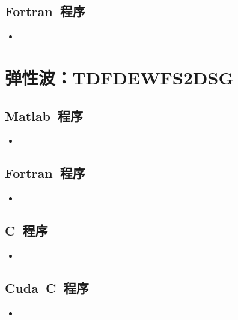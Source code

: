 \documentclass[UTF8]{ctexart}
\newcommand{\insertFcode}[2]{\begin{itemize}\item[]\end{itemize}}
\newcommand{\insertMcode}[2]{\begin{itemize}\item[]\end{itemize}}
\newcommand{\insertCcode}[2]{\begin{itemize}\item[]\end{itemize}}
\begin{document}
\subsection{Fortran~程序}
\insertFcode{./Code/TDFDAWFS2DSG.f90}{}

\newpage
\section{弹性波：TDFDEWFS2DSG}
\subsection{Matlab~程序}
\insertMcode{./Code/TDFDEWFS2DSG.m}{}
\subsection{Fortran~程序}
\insertFcode{./Code/TDFDEWFS2DSG.f90}{}
\subsection{C~程序}
\insertCcode{./Code/TDFDEWFS2DSG.cpp}{}
\subsection{Cuda~C~程序}
\insertCcode{./Code/TDFDEWFS2DSG.cu}{}
\end{document}
